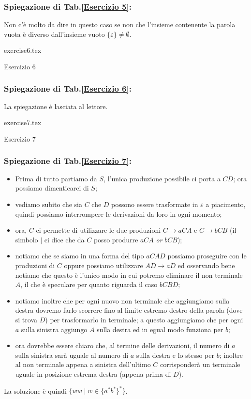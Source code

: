 \documentclass[class=book, crop=false, oneside, 12pt]{standalone}
\begin{document}
\subsubsection*{Spiegazione di Tab.\ref{Esercizio 5}:}
Non c'è molto da dire in questo caso se non che l’insieme contenente la parola vuota è diverso dall’insieme vuoto \(\{\varepsilon\} \neq \emptyset\).
\begin{table}[H]
	\centering
	{exercise6.tex}
    \caption{Esercizio 6}
    \label{Esercizio 6}
\end{table}
\subsubsection*{Spiegazione di Tab.\ref{Esercizio 6}:}
La spiegazione è lasciata al lettore.
\begin{table}[H]
	\centering
	{exercise7.tex}
    \caption{Esercizio 7}
    \label{Esercizio 7}
\end{table}
\subsubsection*{Spiegazione di Tab.\ref{Esercizio 7}:}
\begin{itemize}
    \item Prima di tutto partiamo da \(S\), l'unica produzione possibile ci porta a \(CD\); ora possiamo dimenticarci di \(S\);
    \item vediamo subito che sia \(C\) che \(D\) possono essere trasformate in \(\varepsilon\) a piacimento, quindi possiamo interrompere le derivazioni da loro in ogni momento;
    \item ora, \(C\) ci permette di utilizzare le due produzioni \(C \to aCA\) e \(C \to bCB\) (il simbolo \(\mid\) ci dice che da \(C\) posso produrre \(aCA\) \emph{or} \(bCB\));
    \item notiamo che se siamo in una forma del tipo \(aCAD\) possiamo proseguire con le produzioni di \(C\) oppure possiamo utilizzare \(AD \to aD\) ed osservando bene notiamo che questo è l'unico modo in cui potremo eliminare il non terminale \(A\), il che è speculare per quanto riguarda il caso \(bCBD\);
    \item notiamo inoltre che per ogni nuovo non terminale che aggiungiamo sulla destra dovremo farlo scorrere fino al limite estremo destro della parola (dove si trova \(D\)) per trasformarlo in terminale; a questo aggiungiamo che per ogni \(a\) sulla sinistra aggiungo \(A\) sulla destra ed in egual modo funziona per \(b\);
    \item ora dovrebbe essere chiaro che, al termine delle derivazioni, il numero di \(a\) sulla sinistra  sarà uguale al numero di \(a\) sulla destra e lo stesso per \(b\); inoltre al non terminale appena a sinistra dell'ultimo \(C\) corrisponderà un terminale uguale in posizione estrema destra (appena prima di \(D\)).
\end{itemize}
La soluzione è quindi \(\{ ww \mid w \in \{a^* b^*\}^*\}\).
\end{document}
